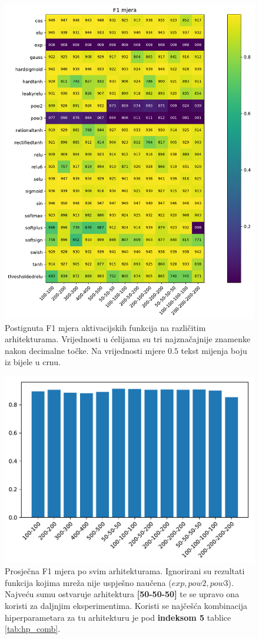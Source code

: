 \documentclass[times, utf8, numeric, diplomski]{fer}
\begin{document}
\begin{figure}[ht]
\includegraphics[width=\textwidth]{greedy_9_f1.pdf}
\centering
\caption{Postignuta F1 mjera aktivacijskih funkcija na različitim arhitekturama. Vrijednosti u ćelijama su tri najznačajnije znamenke nakon decimalne točke. Na vrijednosti mjere $0.5$ tekst mijenja boju iz bijele u crnu.}
\label{fig:greedy_9_f1}
\end{figure}

\begin{figure}[ht]
\includegraphics[width=.8\textwidth]{greedy_9_arch_quality.pdf}
\centering
\caption{Prosječna F1 mjera po svim arhitekturama. Ignorirani su rezultati funkcija kojima mreža nije uspješno naučena ($exp,pow2,pow3$). Najveću sumu ostvaruje arhitektura \textbf{[50-50-50]} te se upravo ona koristi za daljnjim eksperimentima. Koristi se najčešća kombinacija hiperparametara za tu arhitekturu je pod \textbf{indeksom 5} tablice \ref{tab:hp_comb}.}
\label{fig:greedy_9_arch_quality}
\end{figure}
\end{document}
